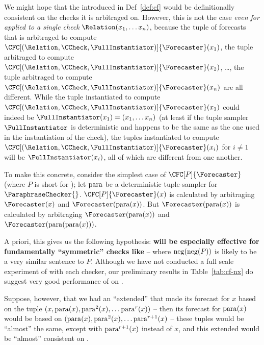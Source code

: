 


\NewDocumentCommand{\checktriple}{}{(\Relation,\CCheck,\FullInstantiator)}

We might hope that the \CFCaster{} introduced in Def~\ref{def:cf} would be definitionally consistent on the checks it is arbitraged on. However, this is not the case \emph{even for }\CFCaster{}\emph{ applied to a single check} $\Relation(x_1,\dots x_n)$,  because the tuple of forecasts that is arbitraged to compute $\CFC[\checktriple]{\Forecaster}(x_1)$, the tuple arbitraged to compute $\CFC[\checktriple]{\Forecaster}(x_2)$, \ldots, the tuple arbitraged to compute $\CFC[\checktriple]{\Forecaster}(x_n)$ are all different. While the tuple instantiated to compute $\CFC[\checktriple]{\Forecaster}(x_1)$ could indeed be $\FullInstantiator(x_1)=(x_1,\dots x_n)$ (at least if the tuple sampler $\FullInstantiator$ is deterministic and happens to be the same as the one used in the instantiation of the check), the tuples instantiated to compute $\CFC[\checktriple]{\Forecaster}(x_i)$ for $i\ne 1$ will be $\FullInstantiator(x_i)$, all of which are different from one another.


To make this concrete, consider the simplest case of $\CFC[P]{\Forecaster}$ (where $P$ is short for \ParaphraseChecker{}); let $\operatorname{para}$ be a deterministic tuple-sampler for $\ParaphraseChecker{}$. $\CFC[P]{\Forecaster}(x)$ is calculated by arbitraging $\Forecaster(x)$ and $\Forecaster(\para(x))$. But $\Forecaster(\para(x))$ is calculated by arbitraging $\Forecaster(\para(x))$ and $\Forecaster(\para(\para(x)))$.

A priori, this gives us the following hypothesis: \textbf{\CFCaster{} will be especially effective for fundamentally ``symmetric'' checks like \NegChecker{}} -- where $\operatorname{neg}(\operatorname{neg}(P))$ is likely to be a very similar sentence to $P$. Although we have not conducted a full scale experiment of \CFCaster{} with each checker, our preliminary results in Table~\ref{tab:cf-nx} do suggest very good performance of \CFCaster{} on \NegChecker{}.

Suppose, however, that we had an ``extended'' \CFCaster{} that made its forecast for $x$ based on the tuple $(x,\operatorname{para}(x),\operatorname{para}^2(x),\dots \operatorname{para}^r(x))$ -- then its forecast for $\operatorname{para}(x)$ would be based on $(\operatorname{para}(x),\operatorname{para}^2(x),\dots\operatorname{para}^{r+1}(x)$ -- these tuples would be ``almost'' the same, except with $\operatorname{para}^{r+1}(x)$ instead of $x$, and this extended \CFCaster{} would be ``almost'' consistent on \ParaphraseChecker{}.

